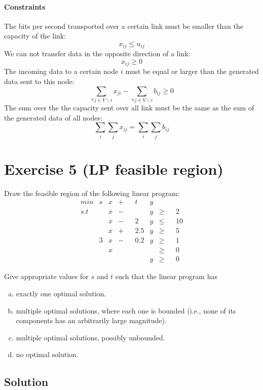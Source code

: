 \documentclass[a4paper, 12pt]{report}
\begin{document}
\paragraph{Constraints} The bits per second transported over a certain link
must be smaller than the capacity of the link:
\[
    x_{ij} ≤ u_{ij}
\]
We can not transfer data in the opposite direction of a link:
\[
    x_{ij} ≥ 0
\]
The incoming data to a certain node $i$ must be equal or larger than the
generated data sent to this node:
\[
    ∑_{∀j ∈ V∖i} x_{ji} - ∑_{∀j ∈ V∖i} b_{ij} ≥ 0
\]
The sum over the the capacity sent over all link must be the same as the sum of
the generated data of all nodes:
\[
    ∑_{i}∑_{j}x_{ij} = ∑_{i}∑_{j}b_{ij}
\]

\section{Exercise 5 (LP feasible region)}

Draw the feasible region of the following linear program:
\begin{align*}
   & min &    s & x    & + &    & t   & y    &   &    &    &\\
   & s.t &      & x    & − &    &     & y    & ≥ &    & 2  &\\
   &     &      & x    & − &    & 2   & y    & ≤ &    & 10 &\\
   &     &      & x    & + &    & 2.5 & y    & ≥ &    & 5  &\\
   &     &    3 & x    & − &    & 0.2 & y    & ≥ &    & 1  &\\
   &     &      & x    &   &    &     &      & ≥ &    & 0  &\\
   &     &      &      &   &    &     & y    & ≥ &    & 0  &
\end{align*}

Give appropriate values for $s$ and $t$ such that the linear program has

\begin{enumerate}[(a)]
    \item exactly one optimal solution.
    \item multiple optimal solutions, where each one is bounded (i.e., none of
          its components has an arbitrarily large magnitude).
    \item multiple optimal solutions, possibly unbounded.
    \item no optimal solution.
\end{enumerate}

\subsection{Solution}
\end{document}
